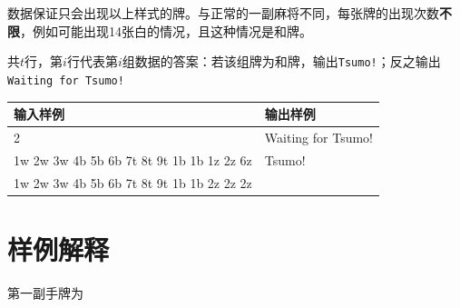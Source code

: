 \documentclass[
	lang=cn,
	color=green
]{elegantbook}
\begin{document}
{	数据保证只会出现以上样式的牌。与正常的一副麻将不同，每张牌的出现次数\textbf{不限}，例如可能出现14张白的情况，且这种情况是和牌。

}{
	共$t$行，第$i$行代表第$i$组数据的答案：若该组牌为和牌，输出\lstinline{Tsumo!}；反之输出\lstinline{Waiting for Tsumo!}

}{
\begin{tabularx}{450pt}{X|X}
	\toprule
	输入样例                                  & 输出样例           \\
	\midrule
	2                                         & Waiting for Tsumo! \\
	1w 2w 3w 4b 5b 6b 7t 8t 9t 1b 1b 1z 2z 6z & Tsumo!             \\
	1w 2w 3w 4b 5b 6b 7t 8t 9t 1b 1b 2z 2z 2z &                    \\
	\bottomrule
\end{tabularx}

}
\section*{样例解释}

第一副手牌为
\end{document}
